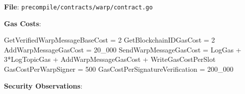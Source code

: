 \documentclass[
]{article}
\newenvironment{Shaded}{}{}
\newcommand{\DecValTok}[1]{\textcolor[rgb]{0.25,0.63,0.44}{#1}}
\newcommand{\NormalTok}[1]{#1}
\newcommand{\OperatorTok}[1]{\textcolor[rgb]{0.40,0.40,0.40}{#1}}
\begin{document}
\textbf{File}: \texttt{precompile/contracts/warp/contract.go}

\textbf{Gas Costs}:

\begin{Shaded}
\begin{Highlighting}[]
\NormalTok{GetVerifiedWarpMessageBaseCost }\OperatorTok{=} \DecValTok{2}
\NormalTok{GetBlockchainIDGasCost         }\OperatorTok{=} \DecValTok{2}
\NormalTok{AddWarpMessageGasCost          }\OperatorTok{=} \DecValTok{20\_000}
\NormalTok{SendWarpMessageGasCost         }\OperatorTok{=}\NormalTok{ LogGas }\OperatorTok{+} \DecValTok{3}\OperatorTok{*}\NormalTok{LogTopicGas }\OperatorTok{+}\NormalTok{ AddWarpMessageGasCost }\OperatorTok{+}\NormalTok{ WriteGasCostPerSlot}
\NormalTok{GasCostPerWarpSigner           }\OperatorTok{=} \DecValTok{500}
\NormalTok{GasCostPerSignatureVerification }\OperatorTok{=} \DecValTok{200\_000}
\end{Highlighting}
\end{Shaded}

\textbf{Security Observations}:
\end{document}
